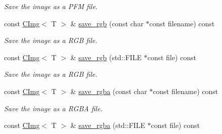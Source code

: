 \begin{DoxyCompactItemize}
\begin{DoxyCompactList}\small\item\em Save the image as a PFM file. \item\end{DoxyCompactList}\item 
\hypertarget{structcimg__library_1_1CImg_aaeff8cd6ea1e998a0bf905dd9c706123}{
const \hyperlink{structcimg__library_1_1CImg}{CImg}$<$ T $>$ \& \hyperlink{structcimg__library_1_1CImg_aaeff8cd6ea1e998a0bf905dd9c706123}{save\_\-rgb} (const char $\ast$const filename) const }
\label{structcimg__library_1_1CImg_aaeff8cd6ea1e998a0bf905dd9c706123}

\begin{DoxyCompactList}\small\item\em Save the image as a RGB file. \item\end{DoxyCompactList}\item 
\hypertarget{structcimg__library_1_1CImg_a9e008b43bd1e4d9a5accc1f6844007e1}{
const \hyperlink{structcimg__library_1_1CImg}{CImg}$<$ T $>$ \& \hyperlink{structcimg__library_1_1CImg_a9e008b43bd1e4d9a5accc1f6844007e1}{save\_\-rgb} (std::FILE $\ast$const file) const }
\label{structcimg__library_1_1CImg_a9e008b43bd1e4d9a5accc1f6844007e1}

\begin{DoxyCompactList}\small\item\em Save the image as a RGB file. \item\end{DoxyCompactList}\item 
\hypertarget{structcimg__library_1_1CImg_a9a794b3b53e9e1bf8d5d6b0e1b97bc26}{
const \hyperlink{structcimg__library_1_1CImg}{CImg}$<$ T $>$ \& \hyperlink{structcimg__library_1_1CImg_a9a794b3b53e9e1bf8d5d6b0e1b97bc26}{save\_\-rgba} (const char $\ast$const filename) const }
\label{structcimg__library_1_1CImg_a9a794b3b53e9e1bf8d5d6b0e1b97bc26}

\begin{DoxyCompactList}\small\item\em Save the image as a RGBA file. \item\end{DoxyCompactList}\item 
\hypertarget{structcimg__library_1_1CImg_a464ea07ef98a474eeac51df79b6ab07d}{
const \hyperlink{structcimg__library_1_1CImg}{CImg}$<$ T $>$ \& \hyperlink{structcimg__library_1_1CImg_a464ea07ef98a474eeac51df79b6ab07d}{save\_\-rgba} (std::FILE $\ast$const file) const }
\label{structcimg__library_1_1CImg_a464ea07ef98a474eeac51df79b6ab07d}


\end{DoxyCompactItemize}
